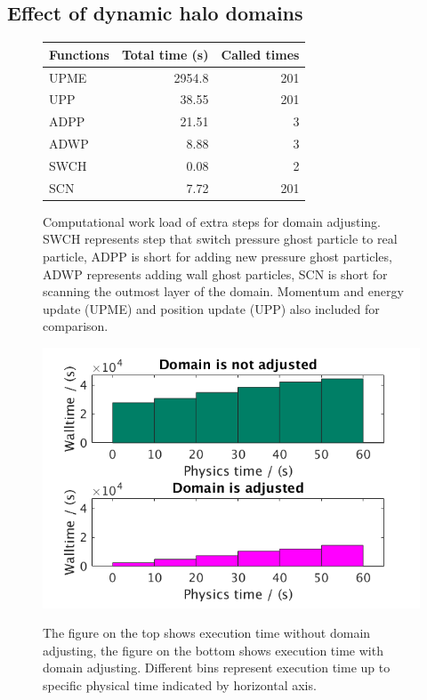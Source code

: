 \subsection{Effect of dynamic halo domains}
\begin{figure}
\centering
{	  
    \begin{tabular}{lrr}
    \hline
    Functions & Total time (s) & Called times\\
    	\hline
    UPME & 2954.8 & 201 \\
    UPP & 38.55 &  201 \\
    ADPP & 21.51 & 3 \\
    ADWP  & 8.88 & 3 \\
    SWCH & 0.08 &  2 \\
    SCN  & 7.72 & 201 \\
    \hline
  \end{tabular}
}
{\caption{Computational work load of extra steps for domain adjusting. SWCH represents step that switch pressure ghost particle to real particle, ADPP is short for adding new pressure ghost particles, ADWP represents adding wall ghost particles, SCN is short for scanning the outmost layer of the domain.  Momentum and energy update (UPME) and position update (UPP) also included for comparison.}
\label{tab:Computational_cost_doamin_adj}}
\centering
{\includegraphics[scale=0.35]{Chapter-5/Figures/adj_vs_no}}
{\caption{The figure on the top shows execution time without domain adjusting, the figure on the bottom shows execution time with domain adjusting. Different bins represent execution time up to specific physical time indicated by horizontal axis.}
\label{fig:adj_vs_no}}
\end{figure}
